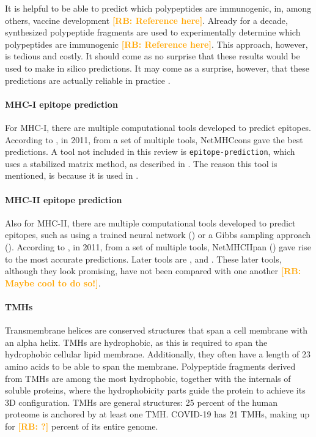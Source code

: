 \documentclass{article}
\newcommand{\richel}[1]{\textcolor{orange}{\textbf{[RB: #1]}}}
\begin{document}
It is helpful to be able to predict which polypeptides are immunogenic,
in, among others, vaccine development \richel{Reference here}. 
Already for a decade, synthesized polypeptide fragments are used 
to experimentally determine which polypeptides
are immunogenic \richel{Reference here}.
This approach, however, is tedious and costly.
It should come as no surprise that these results would be used
to make in silico predictions.
It may come as a surprise, however, that these predictions
are actually reliable in practice \cite{larsen2010identification,schellens2008unanticipated,tang2011genome}.

\paragraph{MHC-I epitope prediction}

For MHC-I, there are multiple computational tools developed 
to predict epitopes. 
According to \cite{lundegaard2011prediction}, in 2011,
from a set of multiple tools, 
NetMHCcons \cite{karosiene2012netmhccons} gave the best predictions.
A tool not included in this review is \verb;epitope-prediction;,
which uses a stabilized matrix method, as described in \cite{kim2009derivation}.
The reason this tool is mentioned, is because it is used 
in \cite{bianchi2017}.

\paragraph{MHC-II epitope prediction}

Also for MHC-II, there are multiple computational tools developed 
to predict epitopes,
such as using a trained neural network (\cite{nielsen2003reliable})
or a Gibbs sampling approach (\cite{nielsen2004improved}).
According to \cite{lundegaard2011prediction}, in 2011,
from a set of multiple tools, 
NetMHCIIpan (\cite{nielsen2008quantitative,karosiene2013netmhciipan})
gave rise to the most accurate predictions.
Later tools are \cite{zhang2013predicting},
\cite{trolle2014nettepi} and \cite{zhang2015accurate}.
These later tools, although they look promising, have not been compared
with one another \richel{Maybe cool to do so!}.

\paragraph{TMHs}

Transmembrane helices are conserved structures that span
a cell membrane with an alpha helix.
TMHs are hydrophobic, as this is required to span the 
hydrophobic cellular lipid membrane. Additionally,
they often have a length of 23 amino acids to be able to span
the membrane.
Polypeptide fragments derived from TMHs are among the most hydrophobic,
together with the internals of soluble proteins, where the
hydrophobicity parts guide the protein to achieve its 3D configuration.
TMHs are general structures: 25 percent of the human proteome is
anchored by at least one TMH. COVID-19 has 21 TMHs, 
making up for \richel{?} percent of its entire genome.
\end{document}
